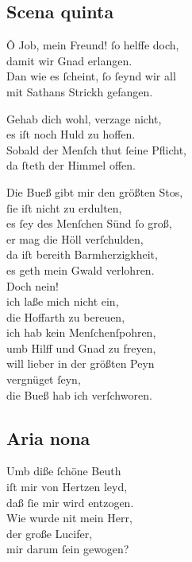 \documentclass{ees}
\newenvironment{lyrics}[1]{%
  \subsection{#1}\nopagebreak%
  \begin{lyricslist}%
  \let\voice\item%
}{%
  \end{lyricslist}%
}
\begin{document}
\begin{lyrics}{Scena quinta}
  \voice[Eliphas]
  Ô Job, mein Freund! ſo helffe doch,\\
  damit wir Gnad erlangen.\\
  Dan wie es ſcheint, ſo ſeynd wir all\\
  mit Sathans Strickh gefangen.

  \voice[Job]
  Gehab dich wohl, verzage nicht,\\
  es iſt noch Huld zu hoffen.\\
  Sobald der Menſch thut ſeine Pflicht,\\
  da ſteth der Himmel offen.

  \voice[Leviathan]
  Die Bueß gibt mir den größten Stos,\\
  ſie iſt nicht zu erdulten,\\
  es ſey des Menſchen Sünd ſo groß,\\
  er mag die Höll verſchulden,\\
  da iſt bereith Barmherzigkheit,\\
  es geth mein Gwald verlohren.\\
  Doch nein!\\
  ich laße mich nicht ein,\\
  die Hoffarth zu bereuen,\\
  ich hab kein Menſchenſpohren,\\
  umb Hilff und Gnad zu freyen,\\
  will lieber in der größten Peyn\\
  vergnüget ſeyn,\\
  die Bueß hab ich verſchworen.
\end{lyrics}

\begin{lyrics}{Aria nona}
  \voice[Leviathan]
  Umb diße ſchöne Beuth\\
  iſt mir von Hertzen leyd,\\
  daß ſie mir wird entzogen.\\[1ex]
  Wie wurde nit mein Herr,\\
  der große Lucifer,\\
  mir darum ſein gewogen?
\end{lyrics}
\end{document}
